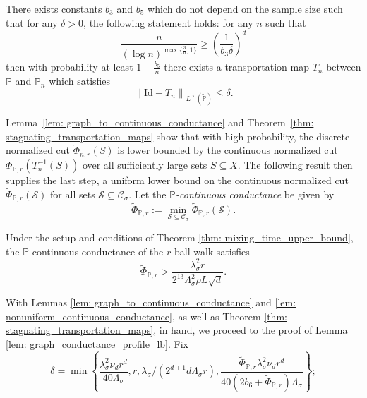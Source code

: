 \documentclass[11pt,twoside]{article}
\newcommand{\set}[1]{\left\{#1\right\}}
\newcommand{\norm}[1]{\left\lVert#1\right\rVert}
\newcommand{\1}{\mathbbm{1}}
\newcommand{\Xbf}{X}
\newcommand{\Pbb}{\mathbb{P}}
\newcommand{\Sset}{\mathcal{S}}
\newcommand{\Cset}{\mathcal{C}}
\newcommand{\Csig}{\Cset_{\sigma}}
\begin{document}
\begin{theorem}
	\label{thm: stagnating_transportation_maps}
	There exists constants $b_3$ and $b_5$ which do not depend on the sample size such that for any $\delta > 0$, the following statement holds: for any $n$ such that
	\begin{equation*}
	\frac{n}{(\log n)^{\max\{\frac{3}{d},1\}}} \geq \left(\frac{1}{b_3\delta}\right)^{d}
	\end{equation*}
	then with probability at least $1 - \frac{b_5}{n}$ there exists a transportation map $T_n$ between $\widetilde{\Pbb}$ and $\widetilde{\Pbb}_n$
	which satisfies
	\begin{equation*}
	\norm{\mathrm{Id} - T_n}_{L^{\infty}(\widetilde{\Pbb})} \leq \delta.
	\end{equation*}
\end{theorem}
Lemma~\ref{lem: graph_to_continuous_conductance} and Theorem~\ref{thm: stagnating_transportation_maps} show that with high probability, the discrete normalized cut $\widetilde{\Phi}_{n,r}(S)$ is lower bounded by the continuous normalized cut $\widetilde{\Phi}_{\Pbb,r}(T_n^{-1}(S))$ over all sufficiently large sets $S \subseteq \Xbf$. The following result then supplies the last step, a uniform lower bound on the continuous normalized cut $\widetilde{\Phi}_{\Pbb,r}(\Sset)$ for all sets $\Sset \subseteq \Csig$. Let the \emph{$\Pbb$-continuous conductance} be given by
\begin{equation*}
\widetilde{\Phi}_{\Pbb,r} := \min_{\Sset \subseteq \Csig} \widetilde{\Phi}_{\Pbb,r}(\Sset).
\end{equation*} 
\begin{lemma}
	\label{lem: nonuniform_continuous_conductance}
	Under the setup and conditions of Theorem \ref{thm: mixing_time_upper_bound}, the $\Pbb$-continuous conductance of the $r$-ball walk satisfies
	\begin{equation*}
	\widetilde{\Phi}_{\Pbb,r} > \frac{\lambda_{\sigma}^2 r}{2^{13} \Lambda_{\sigma}^2 \rho L \sqrt{d}}.
	\end{equation*}
\end{lemma}
With Lemmas \ref{lem: graph_to_continuous_conductance} and \ref{lem: nonuniform_continuous_conductance}, as well as Theorem \ref{thm: stagnating_transportation_maps}, in hand, we proceed to the proof of Lemma \ref{lem: graph_conductance_profile_lb}. Fix
\begin{equation*}
\delta = \min\set{\frac{\lambda_{\sigma}^2\nu_dr^d}{40\Lambda_{\sigma}},r, \lambda_{\sigma}/(2^{d+1}d\Lambda_{\sigma}r),\frac{\widetilde{\Phi}_{\Pbb,r} \lambda_{\sigma}^2\nu_dr^d}{40(2b_6 + \widetilde{\Phi}_{\Pbb,r}) \Lambda_{\sigma}}};
\end{equation*}
\end{document}
